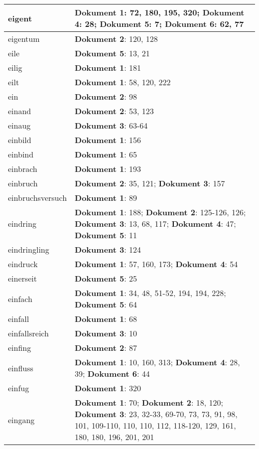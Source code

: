 \documentclass[a5paper]{article}
\begin{document}
\begin{longtable}[l]{|l|p{3in}|}
\hline
eigent & \textbf{Dokument 1}: 72, 180, 195, 320; \textbf{Dokument 4}: 28; \textbf{Dokument 5}: 7; \textbf{Dokument 6}: 62, 77 \\
\hline
eigentum & \textbf{Dokument 2}: 120, 128 \\
\hline
eile & \textbf{Dokument 5}: 13, 21 \\
\hline
eilig & \textbf{Dokument 1}: 181 \\
\hline
eilt & \textbf{Dokument 1}: 58, 120, 222 \\
\hline
ein & \textbf{Dokument 2}: 98 \\
\hline
einand & \textbf{Dokument 2}: 53, 123 \\
\hline
einaug & \textbf{Dokument 3}: 63-64 \\
\hline
einbild & \textbf{Dokument 1}: 156 \\
\hline
einbind & \textbf{Dokument 1}: 65 \\
\hline
einbrach & \textbf{Dokument 1}: 193 \\
\hline
einbruch & \textbf{Dokument 2}: 35, 121; \textbf{Dokument 3}: 157 \\
\hline
einbruchsversuch & \textbf{Dokument 1}: 89 \\
\hline
eindring & \textbf{Dokument 1}: 188; \textbf{Dokument 2}: 125-126, 126; \textbf{Dokument 3}: 13, 68, 117; \textbf{Dokument 4}: 47; \textbf{Dokument 5}: 11 \\
\hline
eindringling & \textbf{Dokument 3}: 124 \\
\hline
eindruck & \textbf{Dokument 1}: 57, 160, 173; \textbf{Dokument 4}: 54 \\
\hline
einerseit & \textbf{Dokument 5}: 25 \\
\hline
einfach & \textbf{Dokument 1}: 34, 48, 51-52, 194, 194, 228; \textbf{Dokument 5}: 64 \\
\hline
einfall & \textbf{Dokument 1}: 68 \\
\hline
einfallsreich & \textbf{Dokument 3}: 10 \\
\hline
einfing & \textbf{Dokument 2}: 87 \\
\hline
einfluss & \textbf{Dokument 1}: 10, 160, 313; \textbf{Dokument 4}: 28, 39; \textbf{Dokument 6}: 44 \\
\hline
einfug & \textbf{Dokument 1}: 320 \\
\hline
eingang & \textbf{Dokument 1}: 70; \textbf{Dokument 2}: 18, 120; \textbf{Dokument 3}: 23, 32-33, 69-70, 73, 73, 91, 98, 101, 109-110, 110, 110, 112, 118-120, 129, 161, 180, 180, 196, 201, 201 \\

\end{longtable}
\end{document}

